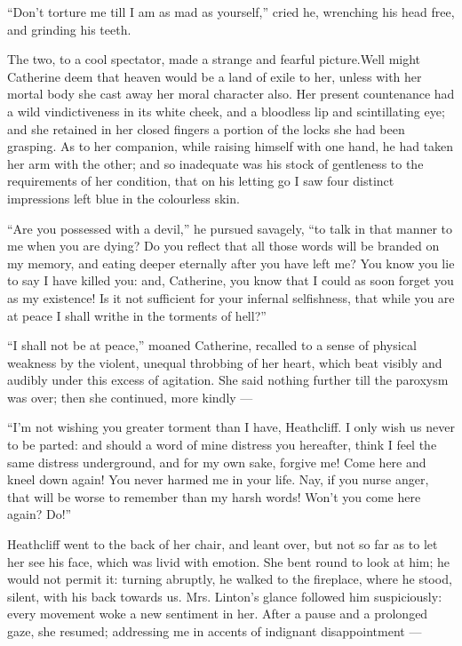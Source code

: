 \par “Don't torture me till I am as mad as yourself,” cried he, wrenching his head free, and grinding his teeth.
\par The two, to a cool spectator, made a strange and fearful picture.Well might Catherine deem that heaven would be a land of exile to her, unless with her mortal body she cast away her moral character also. Her present countenance had a wild vindictiveness in its white cheek, and a bloodless lip and scintillating eye; and she retained in her closed fingers a portion of the locks she had been grasping. As to her companion, while raising himself with one hand, he had taken her arm with the other; and so inadequate was his stock of gentleness to the requirements of her condition, that on his letting go I saw four distinct impressions left blue in the colourless skin.
\par “Are you possessed with a devil,” he pursued savagely, “to talk in that manner to me when you are dying? Do you reflect that all those words will be branded on my memory, and eating deeper eternally after you have left me? You know you lie to say I have killed you: and, Catherine, you know that I could as soon forget you as my existence! Is it not sufficient for your infernal selfishness, that while you are at peace I shall writhe in the torments of hell?”
\par “I shall not be at peace,” moaned Catherine, recalled to a sense of physical weakness by the violent, unequal throbbing of her heart, which beat visibly and audibly under this excess of agitation. She said nothing further till the paroxysm was over; then she continued, more kindly —
\par “I'm not wishing you greater torment than I have, Heathcliff. I only wish us never to be parted: and should a word of mine distress you hereafter, think I feel the same distress underground, and for my own sake, forgive me! Come here and kneel down again! You never harmed me in your life. Nay, if you nurse anger, that will be worse to remember than my harsh words! Won't you come here again? Do!”
\par Heathcliff went to the back of her chair, and leant over, but not so far as to let her see his face, which was livid with emotion. She bent round to look at him; he would not permit it: turning abruptly, he walked to the fireplace, where he stood, silent, with his back towards us. Mrs. Linton's glance followed him suspiciously: every movement woke a new sentiment in her. After a pause and a prolonged gaze, she resumed; addressing me in accents of indignant disappointment —
